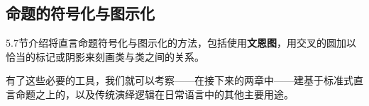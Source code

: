 \subsection{命题的符号化与图示化}
5.7节介绍将直言命题符号化与图示化的方法，包括使用\textbf{文恩图}，用交叉的圆加以恰当的标记或阴影来刻画类与类之间的关系。

\begin{center}
\end{center}

有了这些必要的工具，我们就可以考察——在接下来的两章中——建基于标准式直言命题之上的，以及传统演绎逻辑在日常语言中的其他主要用途。 

\printbibliography[heading=subbibliography,title={第5章参考文献}] 